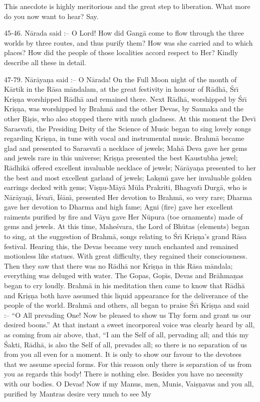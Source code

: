 This anecdote is highly meritorious and the great step to liberation. What more do you now want to hear? Say.

45-46. N\=arada said :-- O Lord! How did Gang\=a come to flow through the three worlds by three routes, and thus purify them? How was she carried and to which places? How did the people of those localities accord respect to Her? Kindly describe all these in detail.

47-79. N\=ar\=aya\d{n}a said :-- O N\=arada! On the Full Moon night of the month of K\=artik in the R\=asa m\=andalam, at the great festivity in honour of R\=adh\=a, \'Sr\={\i} Kri\d{s}\d{n}a worshipped R\=adh\=a and remained there. Next R\=adh\=a, worshipped by \'Sr\={\i} Kri\d{s}\d{n}a, was worshipped by Brahm\=a and the other Devas, by Saunaka and the other \d{R}i\d{s}is, who also stopped there with much gladness. At this moment the Dev\={\i} Sarasvat\={\i}, the Presiding Deity of the Science of Music began to sing lovely songs regarding Kri\d{s}\d{n}a, in tune with vocal and instrumental music. Brahm\=a became glad and presented to Sarasvat\={\i} a necklace of jewels; Mah\=a Deva gave her gems and jewels rare in this universe; Kri\d{s}\d{n}a presented the best Kaustubha jewel; R\=adhik\=a offered excellent invaluable necklace of jewels; N\=ar\=aya\d{n}a presented to her the best and most excellent garland of jewels; Lak\d{s}m\={\i} gave her invaluable golden earrings decked with gems; Vi\d{s}\d{n}u-M\=ay\=a M\=ula Prakriti, Bhagvat\={\i} Durg\=a, who is N\=ar\=aya\d{n}\={\i}, \=I\'svar\={\i}, \=I\'s\=an\={\i}, presented Her devotion to Brahm\=a, so very rare; Dharma gave her devotion to Dharma and high fame; Agni (fire) gave her excellent raiments purified by fire and V\=ayu gave Her N\=upura (toe ornaments) made of gems and jewels. At this time, Mahe\'svara, the Lord of Bh\=utas (elements) began to sing, at the suggestion of Brahm\=a, songs relating to \'Sr\={\i} Kri\d{s}\d{n}a's grand R\=asa festival. Hearing this, the Devas became very much enchanted and remained motionless like statues. With great difficulty, they regained their consciousness. Then they saw that there was no R\=adh\=a nor Kri\d{s}\d{n}a in this R\=asa m\=andala; everything was deluged with water. The Gopas, Gop\={\i}s, Devas and Br\=ahma\d{n}as began to cry loudly. Brahm\=a in his meditation then came to know that R\=adh\=a and Kri\d{s}\d{n}a both have assumed this liquid appearance for the deliverance of the people of the world. Brahm\=a and others, all began to praise \'Sr\={\i} Kri\d{s}\d{n}a and said :-- ``O All prevading One! Now be pleased to show us Thy form and grant us our desired boons.'' At that instant a sweet incorporeal voice was clearly heard by all, as coming from air above, that, ``I am the Self of all, pervading all; and this my \'Sakti, R\=adh\=a, is also the Self of all, prevades all; so there is no separation of us from you all even for a moment. It is only to show our favour to the devotees that we assume special forms. For this reason only there is separation of us from you as regards this body! There is nothing else. Besides you have no necessity with our bodies. O Devas! Now if my Manus, men, Munis, Vai\d{s}\d{n}avas and you all, purified by Mantras desire very much to see My 